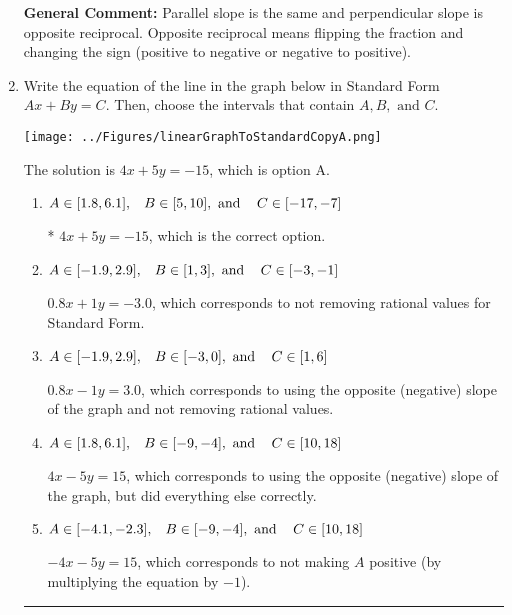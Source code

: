 \documentclass{extbook}[14pt]
\newcommand{\litem}[1]{\item #1

\rule{\textwidth}{0.4pt}}
\begin{document}
\begin{enumerate}
{\textbf{General Comment:} Parallel slope is the same and perpendicular slope is opposite reciprocal. Opposite reciprocal means flipping the fraction and changing the sign (positive to negative or negative to positive).
}
\litem{
Write the equation of the line in the graph below in Standard Form $Ax+By=C$. Then, choose the intervals that contain $A, B, \text{ and } C$.

\begin{center}
    \texttt{[image: ../Figures/linearGraphToStandardCopyA.png]}
\end{center}


The solution is \( 4x + 5y = -15 \), which is option A.\begin{enumerate}[label=\Alph*.]
\item \( A \in [1.8, 6.1], \hspace{3mm} B \in [5, 10], \text{ and } \hspace{3mm} C \in [-17, -7] \)

* $4x + 5y = -15$, which is the correct option.
\item \( A \in [-1.9, 2.9], \hspace{3mm} B \in [1, 3], \text{ and } \hspace{3mm} C \in [-3, -1] \)

 $0.8x + 1y = -3.0$, which corresponds to not removing rational values for Standard Form.
\item \( A \in [-1.9, 2.9], \hspace{3mm} B \in [-3, 0], \text{ and } \hspace{3mm} C \in [1, 6] \)

 $0.8x - 1y = 3.0$, which corresponds to using the opposite (negative) slope of the graph and not removing rational values.
\item \( A \in [1.8, 6.1], \hspace{3mm} B \in [-9, -4], \text{ and } \hspace{3mm} C \in [10, 18] \)

 $4x - 5y = 15$, which corresponds to using the opposite (negative) slope of the graph, but did everything else correctly.
\item \( A \in [-4.1, -2.3], \hspace{3mm} B \in [-9, -4], \text{ and } \hspace{3mm} C \in [10, 18] \)

 $-4x - 5y = 15$, which corresponds to not making $A$ positive (by multiplying the equation by $-1$).
\end{enumerate}

}
\end{enumerate}
\end{document}
